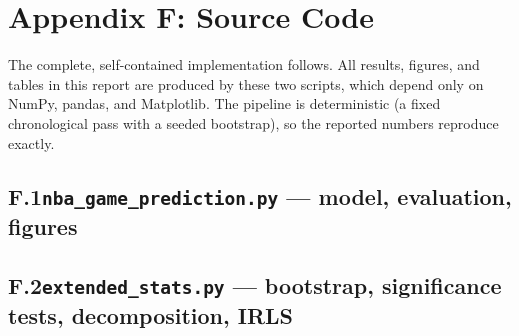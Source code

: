 \documentclass[11pt]{article}
\begin{document}
\clearpage
\section*{Appendix F: Source Code}
The complete, self-contained implementation follows. All results, figures, and
tables in this report are produced by these two scripts, which depend only on
NumPy, pandas, and Matplotlib. The pipeline is deterministic (a fixed chronological
pass with a seeded bootstrap), so the reported numbers reproduce exactly.

\subsection*{F.1\quad \texttt{nba\_game\_prediction.py} --- model, evaluation, figures}


\subsection*{F.2\quad \texttt{extended\_stats.py} --- bootstrap, significance tests, decomposition, IRLS}

\end{document}
